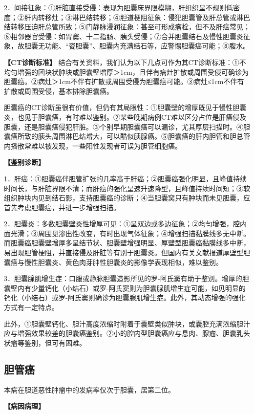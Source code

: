2．间接征象：①肝脏直接受侵：表现为胆囊床界限模糊，肝组织呈不规则低密度；②肝内转移灶；③淋巴结转移；④胆道梗阻征象：侵犯胆囊管及肝总管或淋巴结转移压迫肝总管所致；⑤门静脉浸润征象：甚至可形成瘤栓，但不及肝癌常见；⑥相邻器官受侵：如胃窦、十二指肠、胰头受侵；⑦合并胆囊结石及慢性胆囊炎征象，故胆囊无功能、“瓷胆囊”、胆囊内充满结石等，应警惕胆囊癌可能；⑧腹水。

\textbf{【CT诊断标准】}
结合有关资料，我们认为以下几点可作为其CT诊断标准：①不均匀增强的团块状肿块或胆囊壁增厚＞1cm，且伴有病灶扩散或周围受侵可确诊为胆囊癌。②病灶＞1cm不伴有扩散或周围受侵为胆囊癌可能。③病灶≤1cm不伴有扩散或周围受侵，基本排除胆囊癌。

胆囊癌的CT诊断虽很有价值，但仍有其局限性：①胆囊壁的增厚既见于慢性胆囊炎，也见于胆囊癌，有时难以鉴别。②某些晚期病例CT难以区分占位是肝癌侵及胆囊，还是胆囊癌侵犯肝脏。③个别早期胆囊癌可以漏诊，尤其厚层扫描时。④胆囊癌所致的胰头周围淋巴结增大，可以酷似胰腺癌。⑤胆囊癌的肝内胆管和胆总管内播散常难以被发现，一些阳性发现者可误为胆管细胞癌。

\textbf{【鉴别诊断】}

1．肝癌：①胆囊癌伴胆管扩张的几率高于肝癌；②胆囊癌强化明显，且峰值持续时间长，与肝脏界限不清；而肝癌的强化呈速升速降型，且峰值持续时间短；③软组织肿块内见到结石影，支持胆囊癌的诊断；④当胆囊窝只有肿块而未见胆囊，应首先考虑胆囊癌，并进一步增强扫描。

2．胆囊炎：多数胆囊壁炎性增厚可见：①呈双边或多边征象；②均匀增强，腔内面光滑；③周围见渗出性改变，有时出现气体征象；④增强扫描黏膜线多无中断。而胆囊癌胆囊壁增厚多呈结节状、胆囊壁增强明显、厚壁型胆囊癌黏膜线多中断，易出现胆管梗阻，并直接侵及肝脏等有别于胆囊炎。但国内有关文献报道厚壁型胆囊癌与慢性胆囊炎、黄色肉芽肿性胆囊炎的影像学表现相似，难以鉴别。

3．胆囊腺肌增生症：口服或静脉胆囊造影所见的罗-阿氏窦有助于鉴别。增厚的胆囊壁内有少量钙化（小结石）或罗-阿氏窦则为胆囊腺肌增生症可能，如见明显的钙化（小结石）或罗-阿氏窦则确诊为胆囊腺肌增生症。此外，其动态增强的强化方式有一定特点。

此外，①胆囊壁钙化、胆汁高度浓缩时附着于囊壁类似肿块，或囊腔充满浓缩胆汁应与增强效果较差的胆囊癌鉴别。②小的腔内型胆囊癌应与息肉、腺瘤、胆囊乳头状瘤等鉴别，但可有困难。

\subsection{胆管癌}

本病在胆道恶性肿瘤中的发病率仅次于胆囊，居第二位。

\textbf{【病因病理】}

